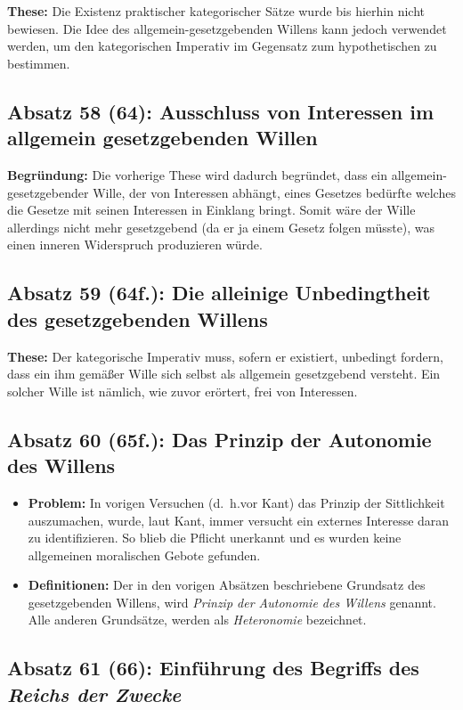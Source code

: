 \documentclass{llncs}
\begin{document}
\textbf{These:} Die Existenz praktischer kategorischer Sätze wurde bis hierhin nicht bewiesen.
Die Idee des allgemein-gesetzgebenden Willens kann jedoch verwendet werden, um den kategorischen Imperativ im Gegensatz zum hypothetischen zu bestimmen.

\subsection*{Absatz 58 (64): Ausschluss von Interessen im allgemein gesetzgebenden Willen}

\textbf{Begründung:} Die vorherige These wird dadurch begründet, dass ein allgemein-gesetzgebender Wille, der von Interessen abhängt, eines Gesetzes bedürfte welches die Gesetze mit seinen Interessen in Einklang bringt.
Somit wäre der Wille allerdings nicht mehr gesetzgebend (da er ja einem Gesetz folgen müsste), was einen inneren Widerspruch produzieren würde.

\subsection*{Absatz 59 (64f.): Die alleinige Unbedingtheit des gesetzgebenden Willens}

\textbf{These:} Der kategorische Imperativ muss, sofern er existiert, unbedingt fordern, dass ein ihm gemäßer Wille sich selbst als allgemein gesetzgebend versteht.
Ein solcher Wille ist nämlich, wie zuvor erörtert, frei von Inter\-essen.

\subsection*{Absatz 60 (65f.): Das Prinzip der Autonomie des Willens}

\begin{itemize}
	\item \textbf{Problem:} In vorigen Versuchen (d.~h.\@ vor Kant) das Prinzip der Sittlichkeit auszumachen, wurde, laut Kant, immer versucht ein externes Interesse daran zu identifizieren.
		So blieb die Pflicht unerkannt und es wurden keine allgemeinen moralischen Gebote gefunden.
	\item \textbf{Definitionen:} Der in den vorigen Absätzen beschriebene Grundsatz des gesetzgebenden Willens, wird \textit{Prinzip der Autonomie des Willens} genannt.
		Alle anderen Grundsätze, werden als \textit{Heteronomie} bezeichnet.
\end{itemize}

\subsection*{Absatz 61 (66): Einführung des Begriffs des \textit{Reichs der Zwecke}}
\end{document}
